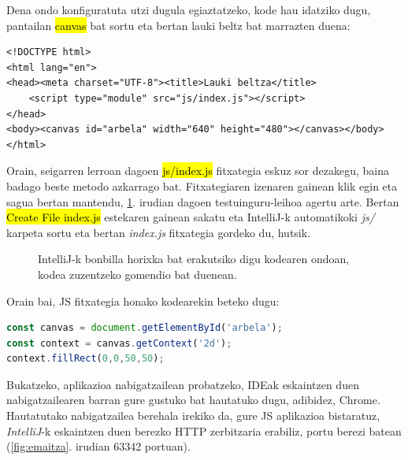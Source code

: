 Dena ondo konfiguratuta utzi dugula egiaztatzeko, kode hau idatziko dugu, pantailan \hl{canvas} bat sortu eta bertan lauki beltz bat marrazten duena:

\begin{lstlisting}
<!DOCTYPE html>
<html lang="en">
<head><meta charset="UTF-8"><title>Lauki beltza</title>
    <script type="module" src="js/index.js"></script>
</head>
<body><canvas id="arbela" width="640" height="480"></canvas></body></html>
\end{lstlisting}

Orain, seigarren lerroan dagoen \hl{js/index.js} fitxategia eskuz sor dezakegu, baina badago beste metodo azkarrago bat. Fitxategiaren izenaren gainean klik egin eta sagua bertan mantendu, \ref{fig:intellijs3}. irudian dagoen testuinguru-leihoa agertu arte. Bertan \hl{Create File index.js} estekaren gainean sakatu eta IntelliJ-k automatikoki \textit{js/} karpeta sortu eta bertan \textit{index.js} fitxategia gordeko du, hutsik. 


\begin{figure}[ht]
	\centering
{}
\caption{ IntelliJ-k bonbilla horixka bat erakutsiko digu kodearen ondoan, kodea zuzentzeko gomendio bat duenean.}
\label{fig:intellijs3}
\end{figure}

Orain bai, JS fitxategia honako kodearekin beteko dugu:
\begin{lstlisting}[language=JavaScript,numbers=none]
const canvas = document.getElementById('arbela');
const context = canvas.getContext('2d');
context.fillRect(0,0,50,50);
\end{lstlisting}

Bukatzeko, aplikazioa nabigatzailean probatzeko, IDEak eskaintzen duen nabigatzailearen barran gure gustuko bat hautatuko dugu, adibidez, Chrome. Hautatutako nabigatzailea berehala irekiko da, gure JS aplikazioa bistaratuz, \textit{IntelliJ}-k eskaintzen duen berezko HTTP zerbitzaria erabiliz, portu berezi batean (\ref{fig:emaitza}. irudian 63342 portuan).

